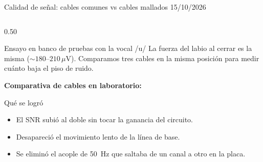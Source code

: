 \documentclass[aspectratio=169,10pt]{beamer}
\begin{document}
\begin{frame}{Calidad de señal: cables comunes vs cables mallados \hfill \textnormal{\footnotesize 15/10/2026}}
    \begin{columns}[c]
        \begin{column}{0.50\textwidth}
            \footnotesize
            \begin{block}{Ensayo en banco de pruebas con la vocal /u/}
                La fuerza del labio al cerrar es la misma ($\sim 180$--$210\,\mu\text{V}$). Comparamos tres cables en la misma posición para medir cuánto baja el piso de ruido.
            \end{block}
            \vspace{0.05cm}
            \textbf{\footnotesize Comparativa de cables en laboratorio:}
            \vspace{0.02cm}
            \centering
            \vspace{0.08cm}
            \begin{block}{Qué se logró}
                \begin{itemize}
                    \item El SNR subió al doble sin tocar la ganancia del circuito.
                    \item Desapareció el movimiento lento de la línea de base.
                    \item Se eliminó el acople de 50~Hz que saltaba de un canal a otro en la placa.
                \end{itemize}

\end{block}
\end{column}
\end{columns}
\end{frame}
\end{document}
